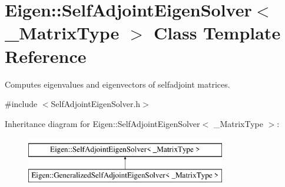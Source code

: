 \hypertarget{class_eigen_1_1_self_adjoint_eigen_solver}{}\section{Eigen\+::Self\+Adjoint\+Eigen\+Solver$<$ \+\_\+\+Matrix\+Type $>$ Class Template Reference}
\label{class_eigen_1_1_self_adjoint_eigen_solver}


Computes eigenvalues and eigenvectors of selfadjoint matrices.  




{\ttfamily \#include $<$Self\+Adjoint\+Eigen\+Solver.\+h$>$}

Inheritance diagram for Eigen\+::Self\+Adjoint\+Eigen\+Solver$<$ \+\_\+\+Matrix\+Type $>$\+:\begin{figure}[H]
\begin{center}
\leavevmode
\includegraphics[height=2.000000cm]{class_eigen_1_1_self_adjoint_eigen_solver}
\end{center}
\end{figure}
